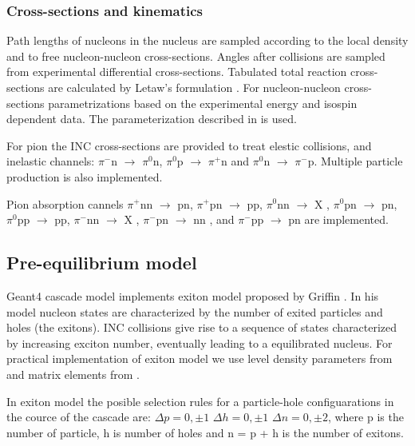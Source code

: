 \documentclass[twocolumn,twoside,slac]{revtex4}
\begin{document}
\subsubsection{Cross-sections and kinematics}

Path lengths of nucleons in the nucleus are sampled according to the local density and to free nucleon-nucleon cross-sections.
Angles after collisions are sampled from experimental differential cross-sections.
Tabulated total reaction cross-sections are calculated by Letaw's formulation \cite{letaw83, letaw93, pearlstein89}.
For nucleon-nucleon cross-sections parametrizations based on the experimental energy and isospin dependent data. 
The parameterization described in \cite{barashenkov72} is used. 

For pion the INC cross-sections are provided to treat elestic collisions, and inelastic channels:
$\pi^{-}$n $\rightarrow$ $\pi^{0}$n, $\pi^{0}$p $\rightarrow$ $\pi^{+}$n and $\pi^{0}$n $\rightarrow$ $\pi^{-}$p.
Multiple particle production is also implemented.

Pion absorption cannels 
$\pi^{+}$nn $\rightarrow$ pn, $\pi^{+}$pn $\rightarrow$ pp, 
$\pi^{0}$nn $\rightarrow$ X , $\pi^{0}$pn $\rightarrow$ pn,      $\pi^{0}$pp $\rightarrow$ pp, 
$\pi^{-}$nn $\rightarrow$ X , $\pi^{-}$pn $\rightarrow$ nn , and $\pi^{-}$pp $\rightarrow$ pn are implemented.


\subsection{Pre-equilibrium model}

Geant4 cascade model implements exiton model proposed by Griffin \cite{griffin66}.
In his model nucleon states are characterized by the number of exited particles and holes (the exitons).
INC collisions give rise to a sequence of states characterized by increasing exciton number, eventually leading to a equilibrated nucleus.
For practical implementation of exiton model we use level density parameters from \cite{ribansky73} and  matrix elements from \cite{kalbach78}.

In exiton model the posible selection rules for a particle-hole configuarations in the cource of the cascade are:
$\Delta p = 0, \pm 1$  $\Delta h = 0, \pm 1$  $\Delta n = 0, \pm 2$,
where p is the number of particle, h is number of holes and n = p + h is the number of exitons. 
\end{document}
